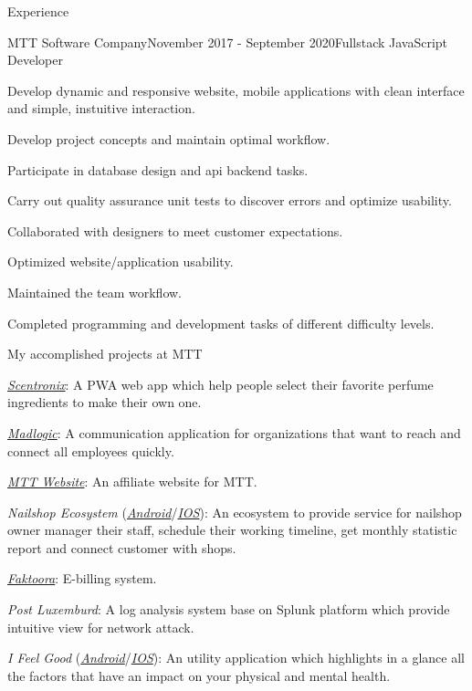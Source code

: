 \documentclass{resume}
\begin{document}
\begin{rSection}{Experience}
    \vspace{0.8cm}\begin{rSubsection}{MTT Software Company}{November 2017 - September 2020}{Fullstack JavaScript Developer}{}
      \item Develop dynamic and responsive website, mobile applications with clean interface and simple, instuitive interaction.
      \item Develop project concepts and maintain optimal workflow.
      \item Participate in database design and api backend tasks.
      \item Carry out quality assurance unit tests to discover errors and optimize usability.
      \item Collaborated with designers to meet customer expectations.
      \item Optimized website/application usability.
      \item Maintained the team workflow.
      \item Completed programming and development tasks of different difficulty levels.
    \end{rSubsection}

    \vspace{-0.5cm}\begin{rSubsection}{}{}{My accomplished projects at MTT}{}
      \item \href{https://app.scnt.me/}{\emph{Scentronix}}: A PWA web app which help people select their favorite perfume ingredients to make their own one.
      \item \href{https://www.madlogic.nl/magic/}{\emph{Madlogic}}: A communication application for organizations that want to reach and connect all employees quickly.
      \item \href{https://mttjsc.com/}{\emph{MTT Website}}: An affiliate website for MTT.
      \item \emph{Nailshop Ecosystem} (\href{https://play.google.com/store/apps/developer?id=MTT+Software+Company+LTD/}{\emph{Android}}/\href{https://apps.apple.com/us/developer/mttjsc/id1250334932}{\emph{IOS}}): 
      An ecosystem to provide service for nailshop owner manager their
      staff, schedule their working timeline, get monthly statistic report and connect customer with shops.
      \item \href{http://app.faktoora.com}{\emph{Faktoora}}: E-billing system.
      \item \emph{Post Luxemburd}: A log analysis system base on Splunk platform which provide intuitive view for network attack.
      \item \emph{I Feel Good} (\href{https://play.google.com/store/apps/details?id=com.ifg_mobile}{\emph{Android}}/\href{}{\emph{IOS}}): 
      An utility application which highlights in a glance all the factors that have an impact on your physical and mental health.
    \end{rSubsection}
  

\end{rSection}
\end{document}
